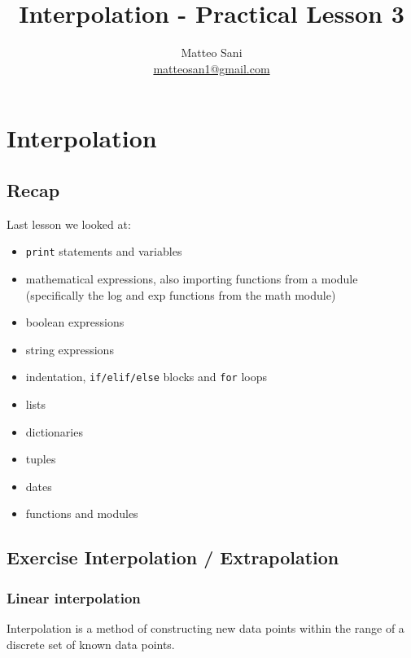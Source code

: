 \documentclass[11pt]{article}
\title{Interpolation - Practical Lesson 3}
\author {Matteo Sani \\ \href{mailto:matteosan1@gmail.com}{matteosan1@gmail.com}}
\providecommand{\tightlist}{%
      \setlength{\itemsep}{0pt}\setlength{\parskip}{0pt}}
\begin{document}
    
    
    \maketitle
    
    

    
    \hypertarget{interpolation---practical-lesson-3}{%
\section{Interpolation}\label{interpolation---practical-lesson-3}}

\hypertarget{recap}{%
\subsection{Recap}\label{recap}}

Last lesson we looked at:

\begin{itemize}
\tightlist
\item
  \texttt{print} statements and variables
\item
  mathematical expressions, also importing functions from a module
  (specifically the log and exp functions from the math module)
\item
  boolean expressions
\item
  string expressions
\item
  indentation, \texttt{if/elif/else} blocks and \texttt{for} loops
\item
  lists
\item
  dictionaries
\item
  tuples
\item
  dates
\item
  functions and modules
\end{itemize}

    \hypertarget{exercise-interpolation-extrapolation}{%
\subsection{Exercise Interpolation /
Extrapolation}\label{exercise-interpolation-extrapolation}}

\hypertarget{linear-interpolation}{%
\subsubsection{Linear interpolation}\label{linear-interpolation}}

Interpolation is a method of constructing new data points within the
range of a discrete set of known data points.
\end{document}
